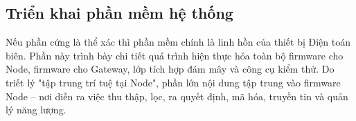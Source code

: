 \lstset{
    basicstyle=\ttfamily\footnotesize,
    keywordstyle=\bfseries,
    breaklines=true,
    frame=single,
    captionpos=b,
    columns=fullflexible,
    showstringspaces=false
}

\subsection{Triển khai phần mềm hệ thống}
Nếu phần cứng là thể xác thì phần mềm chính là linh hồn của thiết bị Điện toán biên. Phần này trình bày chi tiết quá trình hiện thực hóa toàn bộ firmware cho Node, firmware cho Gateway, lớp tích hợp đám mây và công cụ kiểm thử. Do triết lý "tập trung trí tuệ tại Node", phần lớn nội dung tập trung vào firmware Node -- nơi diễn ra việc thu thập, lọc, ra quyết định, mã hóa, truyền tin và quản lý năng lượng.

